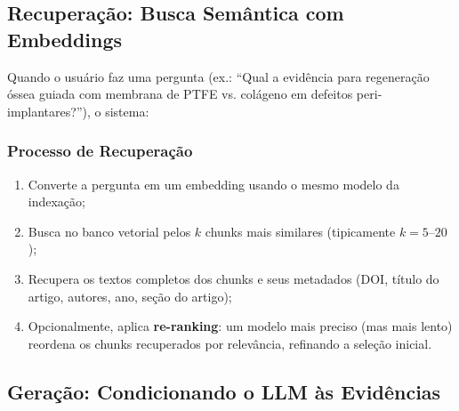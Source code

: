 \subsection{Recuperação: Busca Semântica com Embeddings}

Quando o usuário faz uma pergunta (ex.: ``Qual a evidência para regeneração óssea guiada com membrana de PTFE vs. colágeno em defeitos peri-implantares?''), o sistema:

\subsubsection{Processo de Recuperação}

\begin{enumerate}
    \item Converte a pergunta em um embedding usando o mesmo modelo da indexação;
    \item Busca no banco vetorial pelos $k$ chunks mais similares (tipicamente $k = 5$--$20$);
    \item Recupera os textos completos dos chunks e seus metadados (DOI, título do artigo, autores, ano, seção do artigo);
    \item Opcionalmente, aplica \textbf{re-ranking}: um modelo mais preciso (mas mais lento) reordena os chunks recuperados por relevância, refinando a seleção inicial.
\end{enumerate}


\subsection{Geração: Condicionando o LLM às Evidências}

